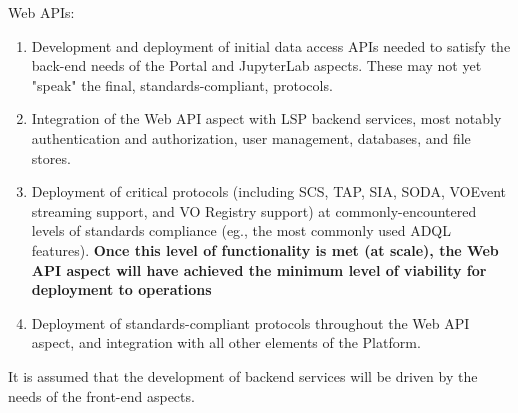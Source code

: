 \documentclass[DM,lsstdraft,toc]{lsstdoc}
\begin{document}
Web APIs:
\begin{enumerate}
	\item Development and deployment of initial data access APIs needed to satisfy the back-end needs of the Portal and JupyterLab aspects. These may not yet "speak" the final, standards-compliant, protocols.
	\item Integration of the Web API aspect with LSP backend services, most notably authentication and authorization, user management, databases, and file stores. 
	\item Deployment of critical protocols (including SCS, TAP, SIA, SODA, VOEvent streaming support, and VO Registry support) at commonly-encountered levels of standards compliance (eg., the most commonly used ADQL features). {\bf Once this level of functionality is met (at scale), the Web API aspect will have achieved the minimum level of viability for deployment to operations}
	\item Deployment of standards-compliant protocols throughout the Web API aspect, and integration with all other elements of the Platform.
\end{enumerate}

It is assumed that the development of backend services will be driven by the needs of the front-end aspects.

\clearpage


\end{document}
